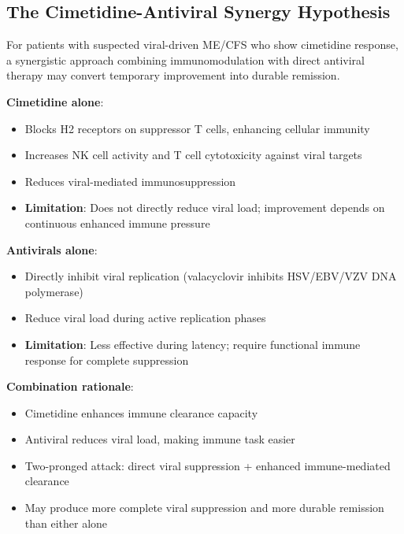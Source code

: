 \subsection{The Cimetidine-Antiviral Synergy Hypothesis}
\label{sec:cimetidine-antiviral-synergy}

For patients with suspected viral-driven ME/CFS who show cimetidine response, a synergistic approach combining immunomodulation with direct antiviral therapy may convert temporary improvement into durable remission.

\begin{hypothesis}
\label{hyp:cimetidine-antiviral}
\textbf{Cimetidine alone}:
\begin{itemize}
    \item Blocks H2 receptors on suppressor T cells, enhancing cellular immunity~\cite{Goldstein1986CimetidineEBV}
    \item Increases NK cell activity and T cell cytotoxicity against viral targets
    \item Reduces viral-mediated immunosuppression
    \item \textbf{Limitation}: Does not directly reduce viral load; improvement depends on continuous enhanced immune pressure
\end{itemize}

\textbf{Antivirals alone}:
\begin{itemize}
    \item Directly inhibit viral replication (valacyclovir inhibits HSV/EBV/VZV DNA polymerase)
    \item Reduce viral load during active replication phases
    \item \textbf{Limitation}: Less effective during latency; require functional immune response for complete suppression
\end{itemize}

\textbf{Combination rationale}:
\begin{itemize}
    \item Cimetidine enhances immune clearance capacity
    \item Antiviral reduces viral load, making immune task easier
    \item Two-pronged attack: direct viral suppression + enhanced immune-mediated clearance
    \item May produce more complete viral suppression and more durable remission than either alone
\end{itemize}
\end{hypothesis}


